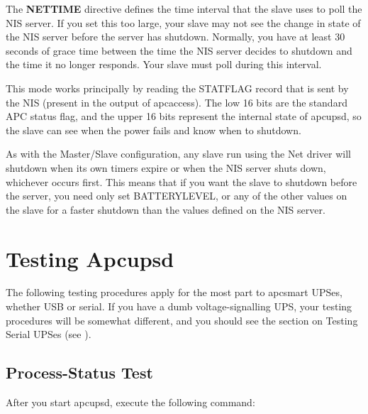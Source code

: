 {The {\bf NETTIME} directive defines the time interval that the slave uses to
poll the NIS server. If you set this too large, your slave may not see the
change in state of the NIS server before the server has shutdown. Normally,
you have at least 30 seconds of grace time between the time the NIS server
decides to shutdown and the time it no longer responds. Your slave must poll
during this interval.  

This mode works principally by reading the STATFLAG record that is sent by the
NIS (present in the output of apcaccess). The low 16 bits are the standard APC
status flag, and the upper 16 bits represent the internal state of apcupsd, so
the slave can see when the power fails and know when to shutdown.  

As with the Master/Slave configuration, any slave run using the Net driver
will shutdown when its own timers expire or when the NIS server shuts down,
whichever occurs first. This means that if you want the slave to shutdown
before the server, you need only set BATTERYLEVEL, or any of the other values
on the slave for a faster shutdown than the values defined on the NIS server. 

\label{Testing-Apcupsd}

\section*{Testing Apcupsd}

\label{index-Testing-84}
The following testing procedures apply for the most part to apcsmart UPSes,
whether USB or serial.  If you have a dumb voltage-signalling UPS, your
testing procedures will be somewhat different, and you should see the section
on Testing Serial UPSes (see 
). 

\label{Process_002dStatus-Test}

\subsection*{Process-Status Test}

\label{index-Process-Status-Testing-85}
\label{index-Testing_002c-Process-Status-86}
After you start apcupsd, execute the following command: 

\footnotesize
\begin{verbatim}
     

\end{verbatim}}
